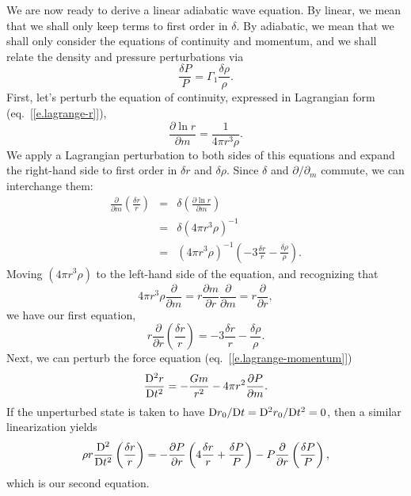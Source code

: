 We are now ready to derive a linear adiabatic wave equation. By linear, we mean that we shall only keep terms to first order in $\delta$.  By adiabatic, we mean that we shall only consider the equations of continuity and momentum, and we shall relate the density and pressure perturbations via
\[ \frac{\delta P}{P} = \Gamma_{1}\frac{\delta \rho}{\rho}. \]
First, let's perturb the equation of continuity, expressed in Lagrangian form (eq.~[\ref{e.lagrange-r}]),
\[
\frac{\partial\ln r}{\partial m} = \frac{1}{4\pi r^{3}\rho}.
\]
We apply a Lagrangian perturbation to both sides of this equations and expand the right-hand side to first order in $\delta r$ and $\delta \rho$.  Since $\delta$ and $\partial/\partial_{m}$ commute, we can interchange them:
\begin{eqnarray*}
\frac{\partial}{\partial m}\left(\frac{\delta r}{r}\right) &=& \delta\left(\frac{\partial \ln r}{\partial m}\right)\\
	&=& \delta\left( 4\pi r^{3}\rho\right)^{-1} \\
	&=& \left(4\pi r^{3}\rho\right)^{-1}\left(-3 \frac{\delta r}{r} - \frac{\delta\rho}{\rho}\right).
\end{eqnarray*}
Moving $(4\pi r^{3}\rho)$ to the left-hand side of the equation, and recognizing that
\[ 4\pi r^{3}\rho \frac{\partial}{\partial m} = r\frac{\partial m}{\partial r}\frac{\partial }{\partial m} = r\frac{\partial }{\partial r}, \]
we have our first equation,
\begin{equation}\label{e.linearized-radial-continuity}
r\frac{\partial}{\partial r}\left(\frac{\delta r}{r}\right) = -3\frac{\delta r}{r} - \frac{\delta \rho}{\rho}.
\end{equation}
Next, we can perturb the force equation (eq.~[\ref{e.lagrange-momentum}])
\[
\frac{\mathrm{D}^{2} r}{\mathrm{D} t^{2}} = -\frac{Gm}{ r^{2}} - 4\pi r^{2}\frac{\partial P}{\partial m}.
\]
If the unperturbed state is taken to have $\mathrm{D} r_{0}/\mathrm{D} t = \mathrm{D}^{2} r_{0}/\mathrm{D} t^{2} = 0$, then a similar linearization yields
\begin{equation}\label{e.linearized-radial-momentum}
\rho r \frac{\mathrm{D}^{2} }{\mathrm{D} t^{2}}\left(\frac{\delta r}{r}\right) = -\frac{\partial P}{\partial r}\left(4\frac{\delta r}{r} + \frac{\delta P}{P}\right) - P \frac{\partial}{\partial r}\left(\frac{\delta P}{P}\right),
\end{equation}
which is our second equation.

